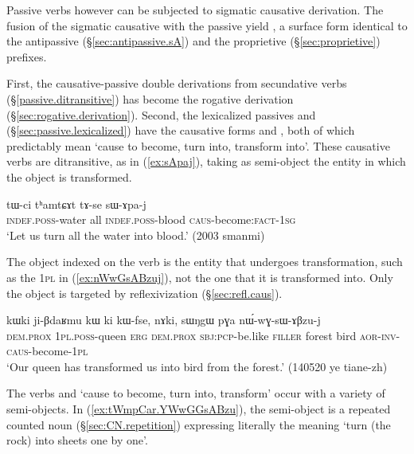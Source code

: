 Passive verbs however can be subjected to sigmatic causative derivation. The fusion of the sigmatic causative  with the passive  yield , a surface form identical to the antipassive (§\ref{sec:antipassive.sA}) and the proprietive (§\ref{sec:proprietive}) prefixes.
 
First, the causative-passive double derivations from secundative verbs (§\ref{passive.ditransitive}) has become the rogative derivation (§\ref{sec:rogative.derivation}).  Second, the lexicalized passives  and  (§\ref{sec:passive.lexicalized}) have the causative forms  and , both of which predictably mean `cause to become, turn into, transform into'. These causative verbs are ditransitive, as in (\ref{ex:sApaj}), taking as semi-object the entity in which the object is transformed.

\begin{exe}
\ex \label{ex:sApaj}
\gll tɯ-ci tʰamtɕɤt tɤ-se sɯ-ɤpa-j \\
\textsc{indef}.\textsc{poss}-water all \textsc{indef}.\textsc{poss}-blood \textsc{caus}-become:\textsc{fact}-\textsc{1sg} \\
\glt `Let us turn all the water into blood.' (2003 smanmi)
\end{exe} 

The object indexed on the verb is the entity that undergoes transformation, such as the \textsc{1pl} in (\ref{ex:nWwGsABzuj}), not the one that it is transformed into. Only the object is targeted by reflexivization (§\ref{sec:refl.caus}). 

\begin{exe}
\ex \label{ex:nWwGsABzuj}
\gll kɯki ji-βdaʁmu kɯ ki kɯ-fse, nɤki, sɯŋgɯ pɣa nɯ́-wɣ-sɯ-ɤβzu-j \\
\textsc{dem}.\textsc{prox} \textsc{1pl}.\textsc{poss}-queen \textsc{erg} \textsc{dem}.\textsc{prox} \textsc{sbj}:\textsc{pcp}-be.like \textsc{filler} forest bird \textsc{aor}-\textsc{inv}-\textsc{caus}-become-\textsc{1pl} \\
\glt `Our queen has transformed us into bird from the forest.' (140520 ye tiane-zh)
\end{exe} 

The verbs  and  `cause to become, turn into, transform' occur with a variety of semi-objects. In (\ref{ex:tWmpCar.YWwGGsABzu}), the semi-object  is a repeated counted noun (§\ref{sec:CN.repetition}) expressing literally the meaning `turn (the rock) into sheets one by one'. 

